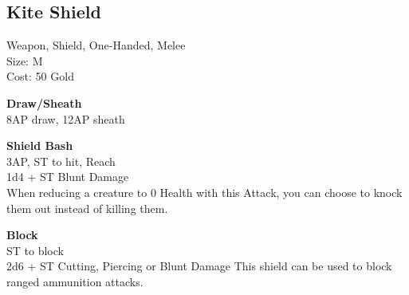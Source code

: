 \subsection{Kite Shield}\label{weapon:kiteShield}
Weapon, Shield, One-Handed, Melee\\
Size: M\\
Cost: 50 Gold

\textbf{Draw/Sheath}\\
8AP draw, 12AP sheath

\textbf{Shield Bash}\\
3AP, ST to hit,  Reach\\
1d4 + \texttimes ST Blunt Damage\\
When reducing a creature to 0 Health with this Attack, you can choose to knock them out instead of killing them.

\textbf{Block}\\
ST to block\\
2d6 + \texttimes ST Cutting, Piercing or Blunt Damage
This shield can be used to block ranged ammunition attacks.\\